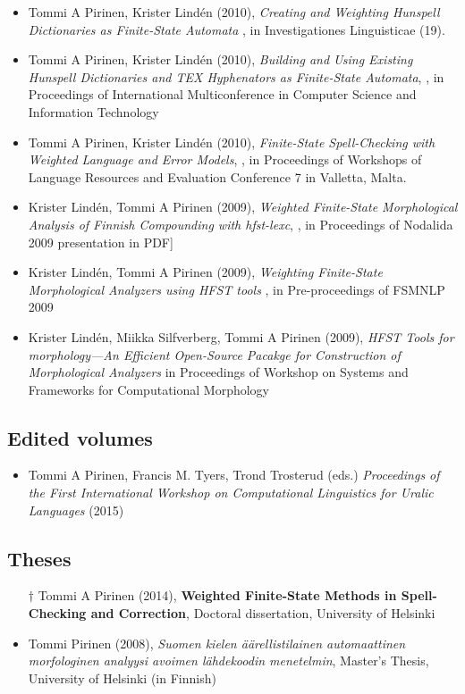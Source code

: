 \documentclass[a4paper]{article}
\begin{document}
\begin{itemize}
\item Tommi A Pirinen, Krister Lindén (2010), \textit{Creating and Weighting Hunspell Dictionaries as Finite-State Automata} , in Investigationes Linguisticae (19).
\item Tommi A Pirinen, Krister Lindén (2010), \textit{Building and Using Existing Hunspell Dictionaries and TEX Hyphenators as Finite-State Automata}, , in Proceedings of International Multiconference in Computer Science and Information Technology
\item Tommi A Pirinen, Krister Lindén (2010), \textit{Finite-State Spell-Checking with Weighted Language and Error Models}, , in Proceedings of Workshops of Language Resources and Evaluation Conference 7 in Valletta, Malta.
\item Krister Lindén, Tommi A Pirinen (2009), \textit{Weighted Finite-State Morphological Analysis of Finnish Compounding with hfst-lexc}, , in Proceedings of Nodalida 2009 presentation in PDF]
\item Krister Lindén, Tommi A Pirinen (2009), \textit{Weighting Finite-State Morphological Analyzers using HFST tools} , in Pre-proceedings of FSMNLP 2009
\item Krister Lindén, Miikka Silfverberg, Tommi A Pirinen (2009), \textit{HFST Tools for morphology—An Efficient Open-Source Pacakge for Construction of Morphological Analyzers} in Proceedings of Workshop on Systems and Frameworks for Computational Morphology
\end{itemize}


\subsection{Edited volumes}

\begin{itemize}
\item Tommi A Pirinen, Francis M. Tyers, Trond Trosterud (eds.) \textit{Proceedings of the First International Workshop on Computational Linguistics for Uralic Languages} (2015)
\end{itemize}

\subsection{Theses}

\begin{itemize}
\item[$\dagger$] Tommi A Pirinen (2014), \textbf{Weighted Finite-State Methods in Spell-Checking and Correction}, Doctoral dissertation, University of Helsinki
\item Tommi Pirinen (2008), \textit{Suomen kielen äärellistilainen automaattinen morfologinen analyysi avoimen lähdekoodin menetelmin}, Master's Thesis, University of Helsinki (in Finnish)
\end{itemize}
\end{document}

